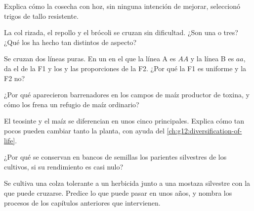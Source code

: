 \begin{exercise}[$\star\star$]\label{exo:g12:domesticated-plants:6}
Explica cómo la cosecha con hoz, sin ninguna intención de mejorar,
seleccionó trigos de tallo resistente.
\end{exercise}

\begin{exercise}[$\star\star$]\label{exo:g12:domesticated-plants:7}
La col rizada, el repollo y el brócoli se cruzan sin dificultad. ¿Son
una  o tres? ¿Qué los ha hecho tan distintos de aspecto?
\end{exercise}

\begin{exercise}[$\star\star$]\label{exo:g12:domesticated-plants:8}
Se cruzan dos líneas puras. En un  en el que la línea A es $AA$ y la
línea B es $aa$, da el  de la F1 y los  y las
proporciones de la F2. ¿Por qué la F1 es uniforme y la F2 no?
\end{exercise}

\begin{exercise}[$\star\star$]\label{exo:g12:domesticated-plants:9}
¿Por qué aparecieron barrenadores  en los campos de maíz
productor de toxina, y cómo los frena un refugio de maíz ordinario?
\end{exercise}

\begin{exercise}[$\star\star$]\label{exo:g12:domesticated-plants:10}
El teosinte y el maíz se diferencian en unos cinco  principales.
Explica cómo tan pocos  pueden cambiar tanto la planta, con ayuda
del \cref{ch:g12:diversification-of-life}.
\end{exercise}

\begin{exercise}[$\star\star$]\label{exo:g12:domesticated-plants:11}
¿Por qué se conservan en bancos de semillas los parientes silvestres de
los cultivos, si su rendimiento es casi nulo?
\end{exercise}

\begin{exercise}[$\star\star\star$]\label{exo:g12:domesticated-plants:12}
Se cultiva una colza tolerante a un herbicida junto a una mostaza
silvestre con la que puede cruzarse. Predice lo que puede pasar en unos
años, y nombra los procesos de los capítulos anteriores que
intervienen.
\end{exercise}

